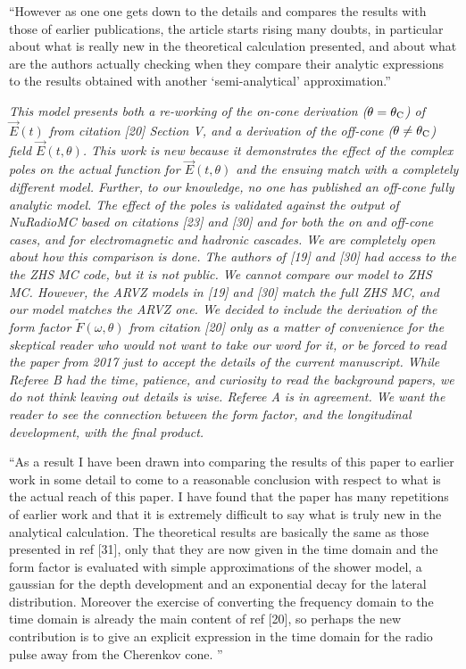 \documentclass[12pt]{article}
\begin{document}
``However as one one gets down to the details and compares the results with those of earlier publications, the article starts rising many doubts, in particular about what is really new in the theoretical calculation presented, and about what are the authors actually checking when they compare their analytic expressions to the results obtained with another `semi-analytical' approximation.''

\textit{This model presents both a re-working of the on-cone derivation ($\theta = \theta_{\rm C}$) of $\vec{E}(t)$ from citation [20] Section V, and a derivation of the off-cone ($\theta \neq \theta_{\rm C}$) field $\vec{E}(t,\theta)$.  This work is new because it demonstrates the effect of the complex poles on the actual function for $\vec{E}(t,\theta)$ and the ensuing match with a completely different model.  Further, to our knowledge, no one has published an off-cone fully analytic model.  The effect of the poles is validated against the output of NuRadioMC based on citations [23] and [30] and for both the on and off-cone cases, and for electromagnetic and hadronic cascades.  We are completely open about how this comparison is done.  The authors of [19] and [30] had access to the the ZHS MC code, but it is not public.  We cannot compare our model to ZHS MC.  However, the ARVZ models in [19] and [30] match the full ZHS MC, and our model matches the ARVZ one.  We decided to include the derivation of the form factor $\widetilde{F}(\omega,\theta)$ from citation [20] only as a matter of convenience for the skeptical reader who would not want to take our word for it, or be forced to read the paper from 2017 just to accept the details of the current manuscript.  While Referee B had the time, patience, and curiosity to read the background papers, we do not think leaving out details is wise.  Referee A is in agreement.  We want the reader to see the connection between the form factor, and the longitudinal development, with the final product.}

``As a result I have been drawn into comparing the results of this paper to earlier work in some detail to come to a reasonable conclusion with respect to what is the actual reach of this paper. I have found that the paper has many repetitions of earlier work and that it is extremely difficult to say what is truly new in the analytical calculation. The theoretical results are basically the same as those presented in ref [31], only that they are now given in the time domain and the form factor is evaluated with simple approximations of the shower model, a gaussian for the depth development and an exponential decay for the lateral distribution. Moreover the exercise of converting the frequency domain to the time domain is already the main content of ref [20], so perhaps the new contribution is to give an explicit expression in the time domain for the radio pulse away from the Cherenkov cone. ''
\end{document}

